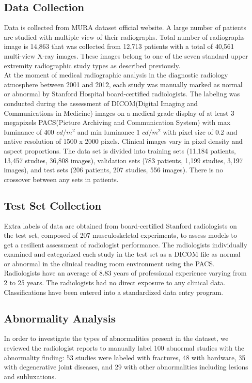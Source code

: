 \documentclass{article}
\begin{document}
\subsection{Data Collection}
Data is collected from MURA dataset official website. A large number of patients are studied with multiple view of their radiographs.  Total number of radiographs image is 14,863 that was collected from 12,713 patients with a total of 40,561 multi-view  X-ray images. These images belong to one of the seven standard upper extremity radiographic study types as described previously.\\
At the moment of medical radiographic analysis in the diagnostic radiology atmosphere between 2001 and 2012, each study was manually marked as normal or abnormal by Stanford Hospital board-certified radiologists. The labeling was conducted during the assessment of DICOM(Digital Imaging and Communications in Medicine) images on a medical grade display of at least 3 megapixels {PACS}(Picture Archiving and Communication System) with max luminance of 400 $cd/m^2$ and min luminance 1 $cd/m^2$ with pixel size of 0.2 and native resolution of 1500 x 2000 pixels. Clinical images vary in pixel density and aspect proportions. The data set is divided into training sets (11,184 patients, 13,457 studies, 36,808 images), validation sets (783 patients, 1,199 studies, 3,197 images), and test sets (206 patients, 207 studies, 556 images). There is no crossover between any sets in patients.

\subsection{Test Set Collection}
Extra labels of data are obtained from board-certified Stanford radiologists on the test set, composed of 207 musculoskeletal experiments, to assess models to get a resilient assessment of radiologist performance. The radiologists individually examined and categorized each study in the test set as a DICOM  file as normal or abnormal in the clinical reading room environment using the {PACS}. Radiologists have an average of 8.83 years of professional experience varying from 2 to 25 years. The radiologists had no direct exposure to any clinical data. Classifications have been entered into a standardized data entry program.

\subsection{Abnormality Analysis}
In order to investigate the types of abnormalities present in the dataset, we reviewed the radiologist reports
to manually label 100 abnormal studies with the abnormality finding: 53 studies were labeled with fractures, 48 with hardware, 35 with degenerative joint diseases, and 29 with other  abnormalities including lesions and subluxations. 
\end{document}
